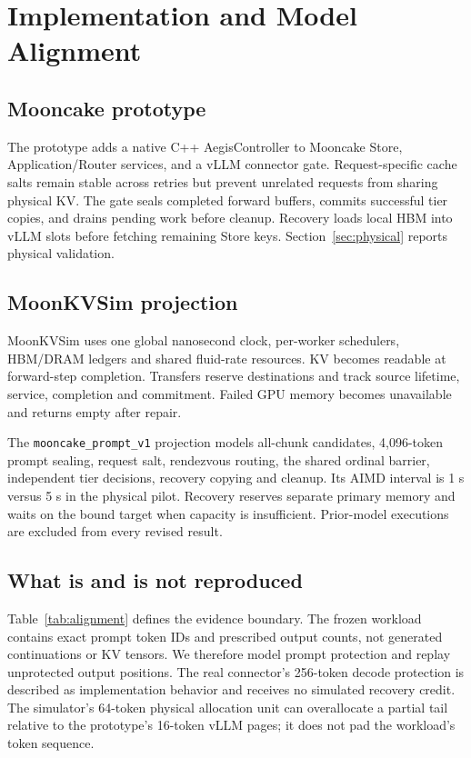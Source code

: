 \section{Implementation and Model Alignment}
\label{sec:implementation}
\subsection{Mooncake prototype}
The prototype adds a native C++ AegisController to Mooncake Store,
Application/Router services, and a vLLM connector gate. Request-specific
cache salts remain stable across retries but prevent unrelated requests
from sharing physical KV. The gate seals completed forward buffers,
commits successful tier copies, and drains pending work before cleanup.
Recovery loads local HBM into vLLM slots before fetching remaining Store
keys. Section~\ref{sec:physical} reports physical validation.

\subsection{MoonKVSim projection}
MoonKVSim uses one global nanosecond clock, per-worker schedulers,
HBM/DRAM ledgers and shared fluid-rate resources. KV becomes readable at
forward-step completion. Transfers reserve destinations and track source
lifetime, service, completion and commitment. Failed GPU memory becomes
unavailable and returns empty after repair.

The \texttt{mooncake\_prompt\_v1} projection models all-chunk candidates,
4,096-token prompt sealing, request salt, rendezvous routing, the shared
ordinal barrier, independent tier decisions, recovery copying and cleanup.
Its AIMD interval is 1 s versus 5 s in the physical pilot. Recovery reserves
separate primary memory and waits on the bound target when capacity is
insufficient. Prior-model executions are excluded from every revised result.

\subsection{What is and is not reproduced}
Table~\ref{tab:alignment} defines the evidence boundary. The frozen workload
contains exact prompt token IDs and prescribed output counts, not generated
continuations or KV tensors. We therefore model prompt protection and replay
unprotected output positions. The real connector's 256-token decode protection
is described as implementation behavior and receives no simulated recovery
credit. The simulator's 64-token physical allocation unit can overallocate a
partial tail relative to the prototype's 16-token vLLM pages; it does not pad
the workload's token sequence.

